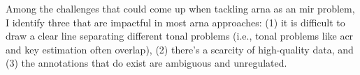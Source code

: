 

Among the challenges that could come up when tackling
\gls{arna} as an \gls{mir} problem, I identify three that
are impactful in most \gls{arna} approaches: (1) it is
difficult to draw a clear line separating different tonal
problems (i.e., tonal problems like \gls{acr} and key
estimation often overlap), (2) there's a scarcity of
high-quality data, and (3) the annotations that do exist are
ambiguous and unregulated.
